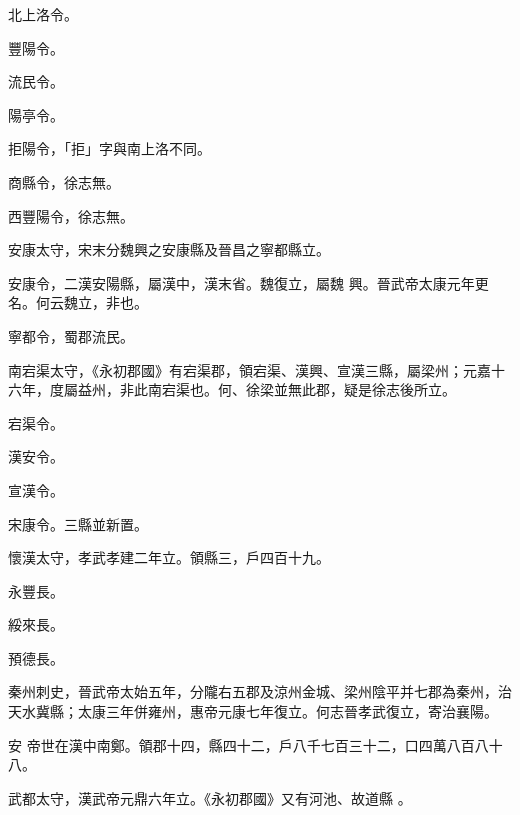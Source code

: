 \begin{pinyinscope}
 北上洛令。



 豐陽令。



 流民令。



 陽亭令。



 拒陽令，「拒」字與南上洛不同。



 商縣令，徐志無。



 西豐陽令，徐志無。



 安康太守，宋末分魏興之安康縣及晉昌之寧都縣立。



 安康令，二漢安陽縣，屬漢中，漢末省。魏復立，屬魏
 興。晉武帝太康元年更名。何云魏立，非也。



 寧都令，蜀郡流民。



 南宕渠太守，《永初郡國》有宕渠郡，領宕渠、漢興、宣漢三縣，屬梁州；元嘉十六年，度屬益州，非此南宕渠也。何、徐梁並無此郡，疑是徐志後所立。



 宕渠令。



 漢安令。



 宣漢令。



 宋康令。三縣並新置。



 懷漢太守，孝武孝建二年立。領縣三，戶四百十九。



 永豐長。



 綏來長。



 預德長。



 秦州刺史，晉武帝太始五年，分隴右五郡及涼州金城、梁州陰平并七郡為秦州，治天水冀縣；太康三年併雍州，惠帝元康七年復立。何志晉孝武復立，寄治襄陽。



 安
 帝世在漢中南鄭。領郡十四，縣四十二，戶八千七百三十二，口四萬八百八十八。


武都太守，漢武帝元鼎六年立。《永初郡國》又有河池、故道縣
 。




\end{pinyinscope}
